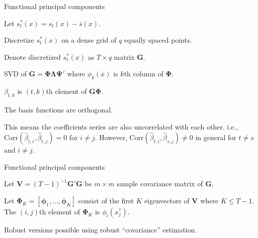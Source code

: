\documentclass[14pt]{beamer}
\begin{document}
\begin{frame}{\large Functional principal components}\fontsize{13}{15}\sf


\biz
\item Let $s_t^*(x) = s_t(x) - \bar{s}(x)$.
\item Discretize $s_t^*(x)$ on a dense grid of $q$ equally spaced points. 
\item Denote discretized $s_t^*(x)$ as $T\times q$ matrix $\bm{G}$.

\item SVD of $\bm{G} = \bm{\Phi}{\bm{\Lambda}}\bm{\Psi}'$ where $\phi_k(x)$ is $k$th column of $\bm{\Phi}$.

\item $\beta_{t,k}$ is $(t,k)$th element of $\bm{G}\bm{\Phi}$.

\item The basis functions are orthogonal.

\item This means the coefficients series are also uncorrelated
with each other. i.e.,
$\mbox{Corr}(\hat\beta_{t,i},\hat\beta_{t,j}) = 0$ for $i\ne
j$. However, $\mbox{Corr}(\hat\beta_{t,i},\hat\beta_{s,j})\ne
0$ in general for $t\ne s$ and $i\ne j$.


\eiz

\end{frame}


\begin{frame}{\large Functional principal components}\fontsize{13}{14.8}\sf
{}
\biz\itemsep=0cm\parskip=0cm
\item Let $\bm{V} = (T-1)^{-1}\bm{G}'\bm{G}$ be $m\times m$ sample covariance
matrix of $\bm{G}$.

\item Let $\bm{\Phi}_K = [\bm{\phi}_1,\dots,\bm{\phi}_K]$ consist of
the first $K$ eigenvectors of $\bm{V}$ where $K\le T-1$. The
$(i,j)$th element of $\bm{\Phi}_K$ is $\phi_i(x^*_j)$.

\item Robust versions possible using robust ``covariance'' estimation.
\eiz


\vspace*{10cm}
\end{frame}
\end{document}
